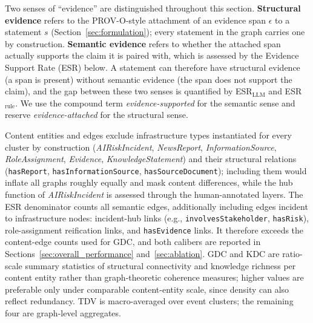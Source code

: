 \documentclass[a4paper,fleqn]{cas-dc}
\begin{document}
Two senses of ``evidence'' are distinguished throughout this section.
\textbf{Structural evidence}
refers to the PROV-O-style attachment of an evidence span $\epsilon$
to a statement $s$ (Section~\ref{sec:formulation}); every statement
in the graph carries one by construction.
\textbf{Semantic evidence} refers to whether the attached span
actually supports the claim it is paired with, which is assessed by
the Evidence Support Rate (ESR) below.
A statement can therefore have structural evidence (a span is
present) without semantic evidence (the span does not support the
claim), and the gap between these two senses is quantified by
ESR$_{\text{LLM}}$ and ESR$_{\text{rule}}$.
We use the compound term \emph{evidence-supported} for the semantic
sense and reserve \emph{evidence-attached} for the structural sense.

Content entities and edges exclude infrastructure types instantiated
for every cluster by construction (\textit{AIRiskIncident},
\textit{NewsReport}, \textit{InformationSource},
\textit{RoleAssignment}, \textit{Evidence}, \textit{KnowledgeStatement})
and their structural relations (\texttt{hasReport},
\texttt{hasInformationSource}, \texttt{hasSourceDocument}); including
them would inflate all graphs roughly equally and mask content
differences, while the hub function of \textit{AIRiskIncident} is
assessed through the human-annotated layers.
The ESR denominator counts all semantic edges, additionally
including edges incident to infrastructure nodes: incident-hub links
(e.g., \texttt{involvesStakeholder}, \texttt{hasRisk}),
role-assignment reification links, and \texttt{hasEvidence} links.
It therefore exceeds the content-edge counts used for GDC, and both
calibers are reported in Sections~\ref{sec:overall_performance}
and~\ref{sec:ablation}.
GDC and KDC are ratio-scale summary statistics of structural
connectivity and knowledge richness per content entity rather than
graph-theoretic coherence measures; higher values are preferable
only under comparable content-entity scale, since density can also
reflect redundancy.
TDV is macro-averaged over event clusters; the remaining four are
graph-level aggregates.
\label{sec:metrics}
\end{document}
